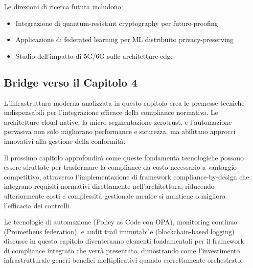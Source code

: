Le direzioni di ricerca futura includono:
\begin{itemize}
    \item Integrazione di quantum-resistant cryptography per future-proofing
    \item Applicazione di federated learning per ML distribuito privacy-preserving
    \item Studio dell'impatto di 5G/6G sulle architetture edge
\end{itemize}

\subsection{\texorpdfstring{Bridge verso il Capitolo 4}{3.8.7 - Bridge verso il Capitolo 4}}

L'infrastruttura moderna analizzata in questo capitolo crea le premesse tecniche indispensabili per l'integrazione efficace della compliance normativa. Le architetture cloud-native, la micro-segmentazione \gls{zerotrust}, e l'automazione pervasiva non solo migliorano performance e sicurezza, ma abilitano approcci innovativi alla gestione della conformità.

Il prossimo capitolo approfondirà come queste fondamenta tecnologiche possano essere sfruttate per trasformare la compliance da costo necessario a vantaggio competitivo, attraverso l'implementazione di framework compliance-by-design che integrano requisiti normativi direttamente nell'architettura, riducendo ulteriormente costi e complessità gestionale mentre si mantiene o migliora l'efficacia dei controlli.

Le tecnologie di automazione (Policy as Code con OPA), monitoring continuo (Prometheus federation), e audit trail immutabile (blockchain-based logging) discusse in questo capitolo diventeranno elementi fondamentali per il framework di compliance integrato che verrà presentato, dimostrando come l'investimento infrastrutturale generi benefici moltiplicativi quando correttamente orchestrato.

